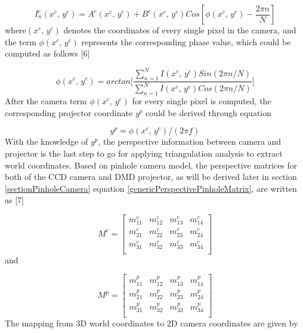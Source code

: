  \begin{equation}
%
I^c_n(x^c, \, y^c) %
= A^c(x^c, \, y^c) + B^c(x^c, \, y^c)Cos[\phi(x^c,\, y^c) - \frac{2\pi n}{N}]
%
\end{equation}%
%
where\((x^c, \, y^c)\) denotes the coordinates of every single pixel in the camera, and the term \(\phi(x^c,\, y^c)\) represents the corresponding phase value, which could be computed as follows [6]\par
 \begin{equation}
%
\phi(x^c,\, y^c) %
= arctan\Bigg[\frac{\sum^N_{n=1}I(x^c,\,y^c)Sin(2\pi n / N)}{\sum^N_{n=1}I(x^c,\,y^c)Cos(2\pi n / N)} \Bigg]
%
\end{equation}
%
%
After the camera term  \(\phi(x^c,\, y^c)\)  for every single pixel is computed, the corresponding projector coordinate \(y^p\) could be derived through equation\par

\begin{equation}
%
y^p %
= \phi(x^c,\, y^c) / (2\pi f)
%
\end{equation}%
%
With the knowledge of \(y^p\), the perspective information between camera and projector is the last step to go for applying triangulation analysis to extract world coordinates. Based on pinhole camera model, the perspective matrices for both of the CCD camera and DMD projector, as will be derived later in section \ref{sectionPinholeCamera} equation \ref{genericPerspectivePinholeMatrix}, are written as [7]\par

\begin{equation}
%
M^c %
= \begin{bmatrix} 
m^c_{11} & m^c_{12} & m^c_{13} & m^c_{14} \\
m^c_{21} & m^c_{22} & m^c_{23} & m^c_{24} \\
m^c_{31} & m^c_{32} & m^c_{33} & m^c_{34} \\
\end{bmatrix}%
%
\end{equation}%
%
and 

\begin{equation}
%
M^p %
= \begin{bmatrix} 
m^p_{11} & m^p_{12} & m^p_{13} & m^p_{14} \\
m^p_{21} & m^p_{22} & m^p_{23} & m^p_{24} \\
m^p_{31} & m^p_{32} & m^p_{33} & m^p_{34} \\
\end{bmatrix}%
%
\end{equation}%
%
The mapping from 3D world coordinates to 2D camera coordinates are given by\par

